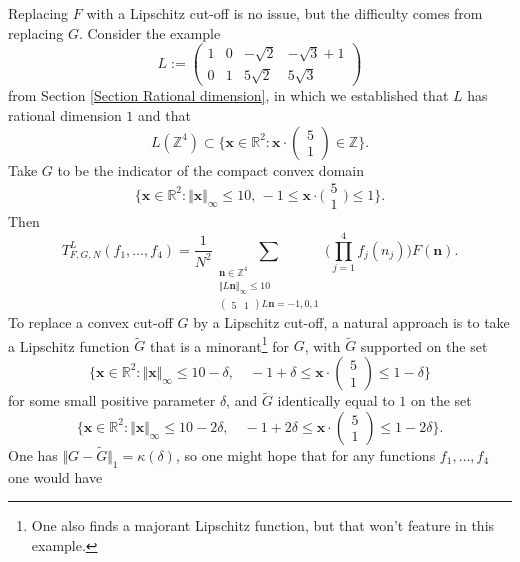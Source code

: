 \documentclass[12pt,a4paper,twoside,reqno]{amsart}
\numberwithin{equation}{section}
\begin{document}
Replacing $F$ with a Lipschitz cut-off is no issue, but the difficulty comes from replacing $G$. Consider the example \[ L:=\left( \begin{matrix} 1& 0 & - \sqrt{2} & -\sqrt{3} + 1 \\ 
0 & 1 & 5 \sqrt{2} & 5 \sqrt{3} \end{matrix} \right)\] from Section \ref{Section Rational dimension}, in which we established that $L$ has rational dimension $1$ and that \[L(\mathbb{Z}^4) \subset \{ \mathbf{x} \in \mathbb{R}^2 : \mathbf{x} \cdot \left(\begin{matrix}5 \\ 1 \end{matrix}\right) \in \mathbb{Z}\}. \]Take $G$ to be the indicator of the compact convex domain \[ \{\mathbf{x} \in \mathbb{R}^2: \Vert \mathbf{x}\Vert_\infty \leqslant 10, \, -1 \leqslant \mathbf{x} \cdot \Big(\begin{matrix}5 \\ 1 \end{matrix}\Big) \leqslant 1 \}.\] Then 
\begin{equation}
\label{explaining}
T_{F,G,N}^L(f_1,\dots,f_4) = \frac{1}{N^2} \sum\limits_{ \substack{ \mathbf{n} \in \mathbb{Z}^4 \\ \Vert L\mathbf{n}\Vert_\infty \leqslant 10 \\ (\begin{smallmatrix}5 & 1 \end{smallmatrix})L\mathbf{n} = -1,0,1}} \Big(\prod\limits_{j=1}^4 f_j(n_j)\Big)F(\mathbf{n}).
\end{equation} To replace a convex cut-off $G$ by a Lipschitz cut-off, a natural approach is to take a Lipschitz function $\widetilde{G}$ that is a minorant\footnote{One also finds a majorant Lipschitz function, but that won't feature in this example.} for $G$, with $\widetilde{G}$ supported on the set \[ \{\mathbf{x} \in \mathbb{R}^2: \Vert \mathbf{x}\Vert_\infty \leqslant 10 - \delta, \quad -1 + \delta \leqslant \mathbf{x} \cdot \left(\begin{matrix}5 \\ 1 \end{matrix}\right)  \leqslant 1 - \delta \}\] for some small positive parameter $\delta$, and $\widetilde{G}$ identically equal to $1$ on the set \[\{\mathbf{x} \in \mathbb{R}^2: \Vert \mathbf{x}\Vert_\infty \leqslant 10 - 2\delta, \quad -1 + 2\delta \leqslant \mathbf{x} \cdot \left(\begin{matrix}5 \\ 1 \end{matrix}\right)  \leqslant 1 - 2\delta \}.\] One has $\Vert G - \widetilde{G}\Vert_1 = \kappa(\delta)$, so one might hope that for any functions $f_1,\dots,f_4$ one would have 
\end{document}
